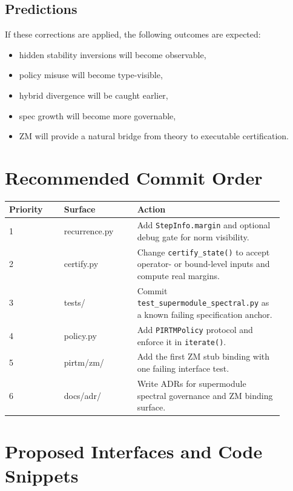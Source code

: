 \documentclass[11pt]{article}
\begin{document}
\subsection{Predictions}

If these corrections are applied, the following outcomes are expected:

\begin{itemize}
\item hidden stability inversions will become observable,
\item policy misuse will become type-visible,
\item hybrid divergence will be caught earlier,
\item spec growth will become more governable,
\item ZM will provide a natural bridge from theory to executable certification.
\end{itemize}

\section{Recommended Commit Order}

\begin{longtable}{p{0.18\linewidth} p{0.24\linewidth} p{0.48\linewidth}}
\toprule
\textbf{Priority} & \textbf{Surface} & \textbf{Action} \\
\midrule
1 & recurrence.py & Add \texttt{StepInfo.margin} and optional debug gate for norm visibility. \\
2 & certify.py & Change \texttt{certify\_state()} to accept operator- or bound-level inputs and compute real margins. \\
3 & tests/ & Commit \texttt{test\_supermodule\_spectral.py} as a known failing specification anchor. \\
4 & policy.py & Add \texttt{PIRTMPolicy} protocol and enforce it in \texttt{iterate()}. \\
5 & pirtm/zm/ & Add the first ZM stub binding with one failing interface test. \\
6 & docs/adr/ & Write ADRs for supermodule spectral governance and ZM binding surface. \\
\bottomrule
\end{longtable}

\section{Proposed Interfaces and Code Snippets}
\end{document}
